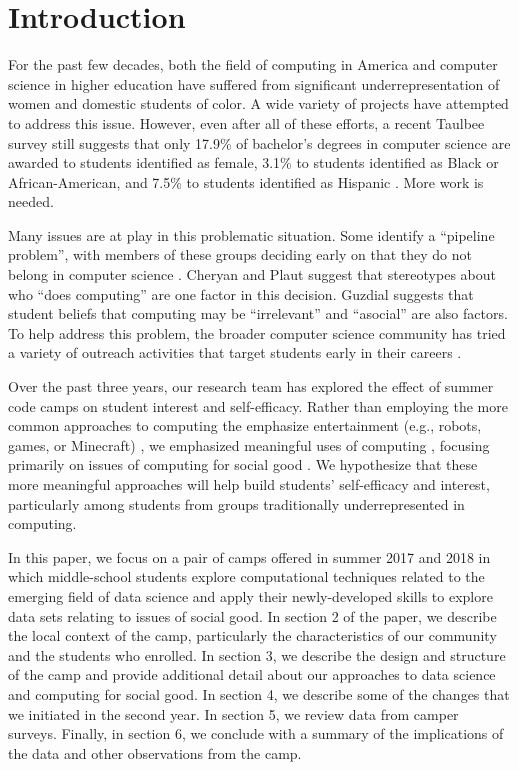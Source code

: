 \section{Introduction}

For the past few decades, both the field of computing in America and
computer science in higher education have suffered from significant
underrepresentation of women and domestic students of color.  A
wide variety of projects have attempted to address this issue.
However, even after all of these efforts, a recent Taulbee survey
still suggests that only 17.9\% of bachelor's degrees in computer
science are awarded to students identified as female, 3.1\% to
students identified as Black or African-American, and 7.5\% to
students identified as Hispanic \cite{Taulbee2016}.  More work is
needed.

Many issues are at play in this problematic situation.  Some identify
a ``pipeline problem'', with members of these groups deciding
early on that they do not belong in computer science \cite{Gurer2002}.
Cheryan and Plaut \cite{Cheryan2010} suggest that stereotypes about
who ``does computing'' are one factor in this decision.  Guzdial
\cite{Guzdial2009} suggests that student beliefs that computing may
be ``irrelevant'' and ``asocial'' are also factors.  To help address
this problem, the broader computer science community has tried a
variety of outreach activities that target students early in their
careers \cite{McGill2015,Decker2016}.

Over the past three years, our research team has explored the effect
of summer code camps on student interest and self-efficacy.  Rather
than employing the more common approaches to computing the emphasize
entertainment (e.g., robots, games, or Minecraft) \cite{DeWitt2017},
we emphasized meaningful uses of computing
\cite{arts-coding,dssg-sigcse-2018}, focusing primarily on issues
of computing for social good \cite{Goldweber2013}.  We hypothesize
that these more meaningful approaches will help build students'
self-efficacy and interest, particularly among students from groups
traditionally underrepresented in computing.

In this paper, we focus on a pair of camps offered in summer 2017
and 2018 in which middle-school students explore computational
techniques related to the emerging field of data science and apply
their newly-developed skills to explore data sets relating to issues
of social good.
%
In section 2 of the paper, we describe the local context of the
camp, particularly the characteristics of our community and the
students who enrolled.  In section 3, we describe the design and
structure of the camp and provide additional detail about our
approaches to data science and computing for social good.  In section
4, we describe some of the changes that we initiated in the second
year.  In section 5, we review data from camper surveys.  Finally,
in section 6, we conclude with a summary of the implications of the
data and other observations from the camp.

